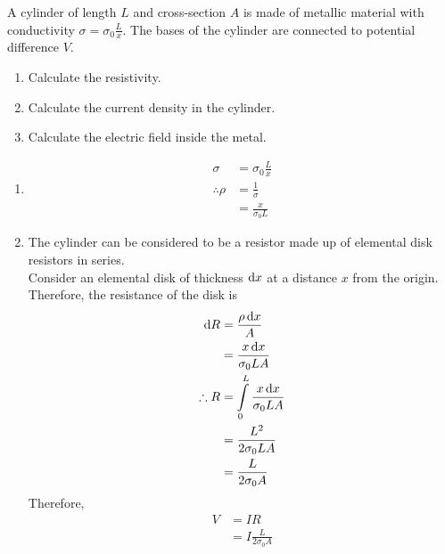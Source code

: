 \documentclass[fleqn, a4paper, 12pt, twoside]{article}
\theoremstyle{definition}
\theoremstyle{theorem}
\begin{document}
\begin{question}
	A cylinder of length $L$ and cross-section $A$ is made of metallic material with conductivity $\sigma = \sigma_0 \frac{L}{x}$.
	The bases of the cylinder are connected to potential difference $V$.
	\begin{enumerate}
		\item Calculate the resistivity.
		\item Calculate the current density in the cylinder.
		\item Calculate the electric field inside the metal.
	\end{enumerate}
\end{question}

\begin{solution}
	\begin{enumerate}[leftmargin = *]
		\item
			\begin{align*}
				\sigma          & = \sigma_0 \frac{L}{x} \\
				\therefore \rho & = \frac{1}{\sigma}     \\
                                                & = \frac{x}{\sigma_0 L}
			\end{align*}
		\item
			The cylinder can be considered to be a resistor made up of elemental disk resistors in series.\\
			Consider an elemental disk of thickness $\dif x$ at a distance $x$ from the origin.\\
			Therefore, the resistance of the disk is
			\begin{align*}
				\dif R       & = \frac{\rho \dif x}{A}                             \\
                                             & = \frac{x \dif x}{\sigma_0 L A}                     \\
				\therefore R & = \int\limits_{0}^{L} \frac{x \dif x}{\sigma_0 L A} \\
                                             & = \frac{L^2}{2 \sigma_0 L A}                        \\
                                             & = \frac{L}{2 \sigma_0 A}
			\end{align*}
			Therefore,
			\begin{align*}
				V                      & = I R                      \\
                                                       & = I \frac{L}{2 \sigma_0 A} \\

\end{align*}
\end{enumerate}
\end{solution}
\end{document}
